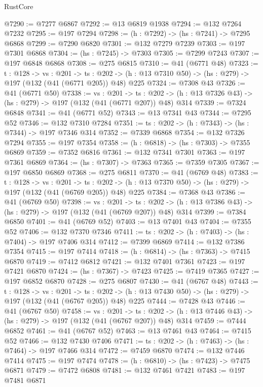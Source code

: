 \begin{lexlean}{RustCore}
\begin{coremodule}
@7290 := @7277 @6867
@7292 := @13 @6819 @1938
@7294 := @132 @7264 @7232
@7295 := @197 @7294
@7298 := (h : @7292) -> (hs : @7241) -> @7295 @6868
@7299 := @7290 @6820
@7301 := @132 @7279 @7239
@7303 := @197 @7301 @6868
@7304 := (hs : @7245) -> @7303
@7305 := @7299 @7243
@7307 := @197 @6848 @6868
@7308 := @275 @6815
@7310 := @41 (@6771 @48)
@7323 := {t : @128} ->
  {vs : @201} ->
  {ts : @202} -> (h : @13 @7310 @50) -> (hs : @279) -> @197 (@132 (@41 (@6771 @205)) @48) @225
@7324 := @7308 @43
@7326 := @41 (@6771 @50)
@7338 := {vs : @201} ->
  {ts : @202} -> (h : @13 @7326 @43) -> (hs : @279) -> @197 (@132 (@41 (@6771 @207)) @48) @314
@7339 := @7324 @6848
@7341 := @41 (@6771 @52)
@7343 := @13 @7341 @43
@7344 := @7295 @52
@7346 := @132 @7310 @7284
@7351 := {ts : @202} -> (h : @7343) -> (hs : @7344) -> @197 @7346 @314
@7352 := @7339 @6868
@7354 := @132 @7326 @7294
@7355 := @197 @7354
@7358 := (h : @6818) -> (hs : @7303) -> @7355 @6869
@7359 := @7352 @6816
@7361 := @132 @7341 @7301
@7363 := @197 @7361 @6869
@7364 := (hs : @7307) -> @7363
@7365 := @7359 @7305
@7367 := @197 @6850 @6869
@7368 := @275 @6811
@7370 := @41 (@6769 @48)
@7383 := {t : @128} ->
  {vs : @201} ->
  {ts : @202} -> (h : @13 @7370 @50) -> (hs : @279) -> @197 (@132 (@41 (@6769 @205)) @48) @225
@7384 := @7368 @43
@7386 := @41 (@6769 @50)
@7398 := {vs : @201} ->
  {ts : @202} -> (h : @13 @7386 @43) -> (hs : @279) -> @197 (@132 (@41 (@6769 @207)) @48) @314
@7399 := @7384 @6850
@7401 := @41 (@6769 @52)
@7403 := @13 @7401 @43
@7404 := @7355 @52
@7406 := @132 @7370 @7346
@7411 := {ts : @202} -> (h : @7403) -> (hs : @7404) -> @197 @7406 @314
@7412 := @7399 @6869
@7414 := @132 @7386 @7354
@7415 := @197 @7414
@7418 := (h : @6814) -> (hs : @7363) -> @7415 @6870
@7419 := @7412 @6812
@7421 := @132 @7401 @7361
@7423 := @197 @7421 @6870
@7424 := (hs : @7367) -> @7423
@7425 := @7419 @7365
@7427 := @197 @6852 @6870
@7428 := @275 @6807
@7430 := @41 (@6767 @48)
@7443 := {t : @128} ->
  {vs : @201} ->
  {ts : @202} -> (h : @13 @7430 @50) -> (hs : @279) -> @197 (@132 (@41 (@6767 @205)) @48) @225
@7444 := @7428 @43
@7446 := @41 (@6767 @50)
@7458 := {vs : @201} ->
  {ts : @202} -> (h : @13 @7446 @43) -> (hs : @279) -> @197 (@132 (@41 (@6767 @207)) @48) @314
@7459 := @7444 @6852
@7461 := @41 (@6767 @52)
@7463 := @13 @7461 @43
@7464 := @7415 @52
@7466 := @132 @7430 @7406
@7471 := {ts : @202} -> (h : @7463) -> (hs : @7464) -> @197 @7466 @314
@7472 := @7459 @6870
@7474 := @132 @7446 @7414
@7475 := @197 @7474
@7478 := (h : @6810) -> (hs : @7423) -> @7475 @6871
@7479 := @7472 @6808
@7481 := @132 @7461 @7421
@7483 := @197 @7481 @6871

\end{coremodule}
\end{lexlean}
